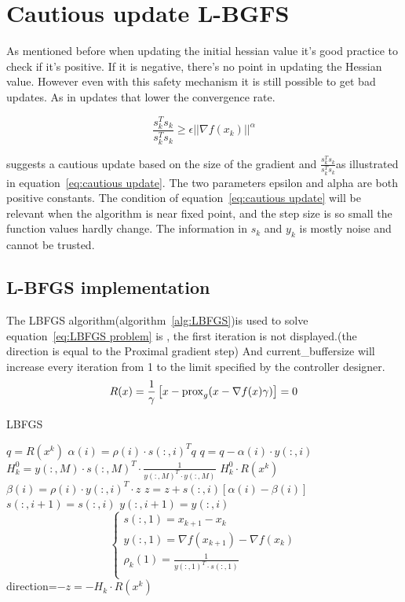 	\section{Cautious update L-BGFS}
	As mentioned before when updating the initial hessian value it's good practice to check if it's positive. If it is negative, there's no point in updating the Hessian value. However even with this safety mechanism it is still possible to get bad updates. As in updates that lower the convergence rate.
	
	\begin{equation}
		\frac{s_k^Ts_k}{s_k^Ts_k} \ge \epsilon ||\nabla f(x_k)||^\alpha
		\label{eq:cautious update}
	\end{equation}
	
	\cite{Dong-HuiLi1999} suggests a cautious update based on the size of the gradient and $\frac{s_k^Ts_k}{s_k^Ts_k}$as illustrated in equation~\ref{eq:cautious update}. The two parameters epsilon and alpha are both positive constants. The condition of equation~\ref{eq:cautious update} will be relevant when the algorithm is near fixed point, and the step size is so small the function values hardly change. The information in $s_k$ and $y_k$ is mostly noise and cannot be trusted.
	
	\subsection{L-BFGS implementation}
		The LBFGS algorithm(algorithm~\ref{alg:LBFGS})is used to solve equation~\ref{eq:LBFGS problem} is , the first iteration is not displayed.(the direction is equal to the Proximal gradient step) And current\_buffersize will increase every iteration from 1 to the limit specified by the controller designer.
		\begin{equation}
		R(x) = \frac{1}{\gamma}\left[ x - \operatorname{prox}_g( x - \nabla f(x)\gamma) \right] = 0
		\label{eq:LBFGS problem}
		\end{equation}
		\begin{algorithm}
			\caption{LBFGS}
			\label{alg:LBFGS}
			\begin{algorithmic}[1]
				\State $q = R(x^k)$
				\State $\alpha(i)=\rho(i) \cdot s(:,i)^Tq$
				\State $q = q - \alpha(i) \cdot y(:,i)$
				\EndFor
				\State $H_k^0 = y(:,M) \cdot s(:,M)^T \cdot  \frac{1}{y(:,M)^T \cdot y(:,M)}$
				\State $H^0_k \cdot R(x^k)$
				\State $\beta(i) = \rho(i) \cdot y(:,i)^T \cdot z$
				\State $z = z + s(:,i)[\alpha(i)-\beta(i)]$
				\EndFor
				\State $s(:,i+1)=s(:,i)$
				\State $y(:,i+1)=y(:,i)$
				\EndFor
				\State $$\begin{cases}
				s(:,1) = x_{k+1} - x_k \\
				y(:,1) = \nabla f(x_{k+1}) - \nabla f(x_k)\\
				\rho_k(1) = \frac{1}{y(:,1)^T \cdot s(:,1)} \\ 
				\end{cases}
				$$
				\State \Return direction=$-z=-H_k \cdot R(x^k)$
				\EndProcedure
			\end{algorithmic}
		\end{algorithm}